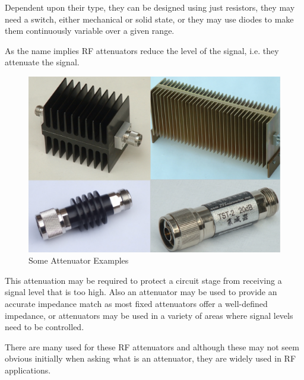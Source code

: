 Dependent upon their type, they can be designed using just resistors, they may need a switch, either mechanical or solid state, or they may use diodes to make them continuously variable over a given range.

	As the name implies RF attenuators reduce the level of the signal, i.e. they attenuate the signal.

\begin{figure}[H]
	\center
	\setlength{\unitlength}{\textwidth} 
	\includegraphics[width=0.75\unitlength]{attn}
	\caption{\label{fig:attn}Some Attenuator Examples }
\end{figure}

	This attenuation may be required to protect a circuit stage from receiving a signal level that is too high. Also an attenuator may be used to provide an accurate impedance match as most fixed attenuators offer a well-defined impedance, or attenuators may be used in a variety of areas where signal levels need to be controlled.

	There are many used for these RF attenuators and although these may not seem obvious initially when asking what is an attenuator, they are widely used in RF applications.




